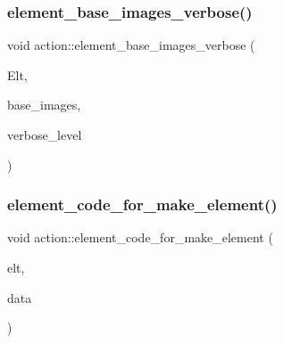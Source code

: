 \mbox{\label{classaction_a1e9bc21306d122f1c7b5b8d98d2d6dfd}} 
\subsubsection{\texorpdfstring{element\+\_\+base\+\_\+images\+\_\+verbose()}{element\_base\_images\_verbose()}}
{\footnotesize\ttfamily void action\+::element\+\_\+base\+\_\+images\+\_\+verbose (\begin{DoxyParamCaption}\item[{\mbox{\hyperlink{galois_8h_a09fddde158a3a20bd2dcadb609de11dc}{I\+NT}} $\ast$}]{Elt,  }\item[{\mbox{\hyperlink{galois_8h_a09fddde158a3a20bd2dcadb609de11dc}{I\+NT}} $\ast$}]{base\+\_\+images,  }\item[{\mbox{\hyperlink{galois_8h_a09fddde158a3a20bd2dcadb609de11dc}{I\+NT}}}]{verbose\+\_\+level }\end{DoxyParamCaption})}

\mbox{\label{classaction_a26fc160074c8b4defaeb54b3b383cce6}} 
\subsubsection{\texorpdfstring{element\+\_\+code\+\_\+for\+\_\+make\+\_\+element()}{element\_code\_for\_make\_element()}}
{\footnotesize\ttfamily void action\+::element\+\_\+code\+\_\+for\+\_\+make\+\_\+element (\begin{DoxyParamCaption}\item[{void $\ast$}]{elt,  }\item[{\mbox{\hyperlink{galois_8h_a09fddde158a3a20bd2dcadb609de11dc}{I\+NT}} $\ast$}]{data }\end{DoxyParamCaption})}

\mbox{\label{classaction_a34c035f1a40913208e5ffc79a729c28c}} 
